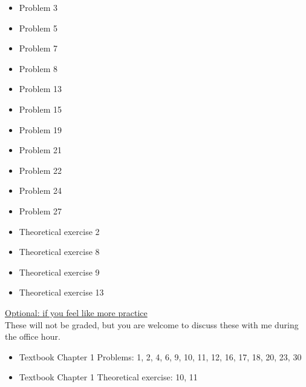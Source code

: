 \documentclass[11pt]{article}
\begin{document}
\begin{itemize}


    \item
    Problem 3
    \item
    Problem 5

    \item
    Problem  7

    \item
    Problem  8

    \item
    Problem  13

    \item
    Problem  15

    \item
    Problem  19

    \item
    Problem  21

    \item
    Problem  22

    \item
    Problem  24

    \item
    Problem  27

    \item
    Theoretical exercise 2

    \item
    Theoretical exercise 8

    \item
    Theoretical exercise 9

    \item
    Theoretical exercise 13



\end{itemize}

\vspace{12pt}

\underline{Optional: if you feel like more practice}\\
These will not be graded, but you are welcome to discuss these with me during the office hour.

\begin{itemize}


\item Textbook  Chapter 1 Problems: 1, 2, 4, 6, 9, 10, 11, 12, 16, 17, 18, 20, 23, 30
\item Textbook  Chapter 1 Theoretical exercise: 10, 11



\end{itemize}
\end{document}
